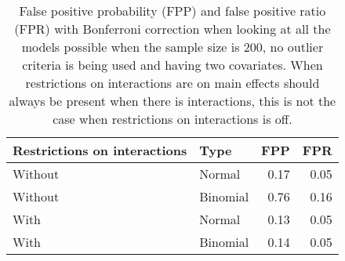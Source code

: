 \begin{longtable}{llrr}
\caption{False positive probability (FPP) and false positive ratio (FPR) with Bonferroni correction when looking at all the models possible when the sample size is 200, no outlier criteria is being used and having two covariates. When restrictions on interactions are on main effects should always be present when there is interactions, this is not the case when restrictions on interactions is off.} \\ 
  \hline
Restrictions on interactions & Type & FPP & FPR \\ 
  \hline
Without & Normal & 0.17 & 0.05 \\ 
  Without & Binomial & 0.76 & 0.16 \\ 
  With & Normal & 0.13 & 0.05 \\ 
  With & Binomial & 0.14 & 0.05 \\ 
   \hline
\hline
\end{longtable}
